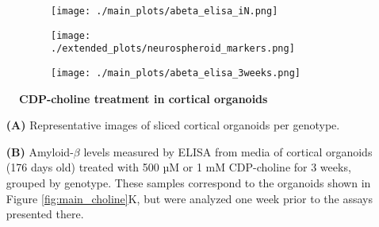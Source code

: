 \begin{figure}[H]
    \begin{subfigure}[t]{0.5\textwidth}
        \caption{}
        \texttt{[image: ./main\_plots/abeta\_elisa\_iN.png]}        
    \end{subfigure}  
    \par
    \begin{subfigure}[t]{0.7\textwidth}
        \caption{}
        \texttt{[image: ./extended\_plots/neurospheroid\_markers.png]}        
    \end{subfigure}
    \par
    \begin{subfigure}[t]{0.7\textwidth}
        \caption{}
        \texttt{[image: ./main\_plots/abeta\_elisa\_3weeks.png]}        
    \end{subfigure}
    \caption{
        \textbf{CDP-choline treatment in cortical organoids}\\
    }
    \label{fig:neurospheroid_figure}
\end{figure}
\begin{itemize}
    \item[\textbf{(A)}] Representative images of sliced cortical organoids per genotype. 
    \item[\textbf{(B)}] Amyloid-$\beta$ levels measured by ELISA from media of cortical organoids (176 days old) treated with 500 µM or 1 mM CDP-choline for 3 weeks, grouped by genotype. These samples correspond to the organoids shown in Figure \ref{fig:main_choline}K, but were analyzed one week prior to the assays presented there.\end{itemize}